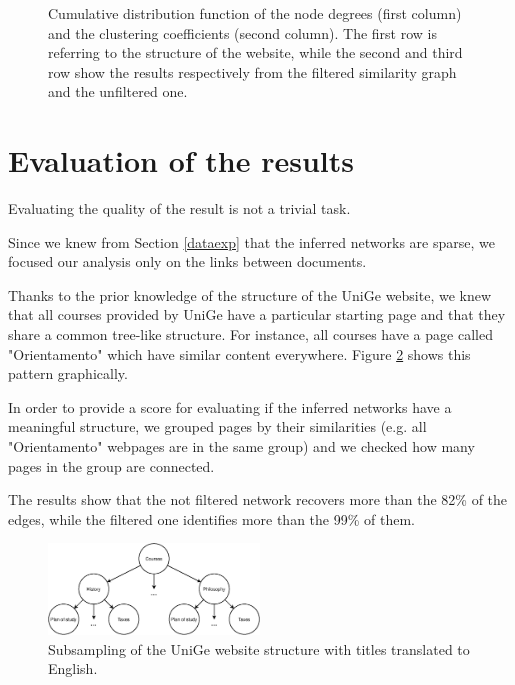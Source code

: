 \begin{figure}[ht]
    \caption{Cumulative distribution function of the node degrees (first column) 
    and the clustering coefficients (second column).
    The first row is referring to the structure of the website, while
    the second and third row show the results respectively from the filtered similarity graph and the unfiltered one.}
    \label{fig:exploration}
\end{figure}



\section{Evaluation of the results} \label{eval}

Evaluating the quality of the result is not a trivial task. 

Since we knew from Section \ref{dataexp} that the inferred networks are sparse, 
we focused our analysis only on the links between documents. 

Thanks to the prior knowledge of the structure of the UniGe website, we knew that 
all courses provided by UniGe have a particular starting page and that
they share a common tree-like structure. 
For instance, all courses have a page called "Orientamento" which have similar content everywhere. 
Figure \ref{fig:unige-structure} shows this pattern graphically.

In order to provide a score for evaluating if the inferred networks have a meaningful structure, 
we grouped pages by their similarities (e.g. all "Orientamento" webpages are in the same group) and 
we checked how many pages in the group are connected. 

The results show that the not filtered network recovers more than the 82\% of the edges, 
while the filtered one identifies more than the 99\% of them. 

\begin{figure}[H]
    \centering
    \includegraphics[width=0.5\textwidth]{images/unige-structure.eps}
    \caption{Subsampling of the UniGe website structure with titles translated to English.}
    \label{fig:unige-structure}
\end{figure}

